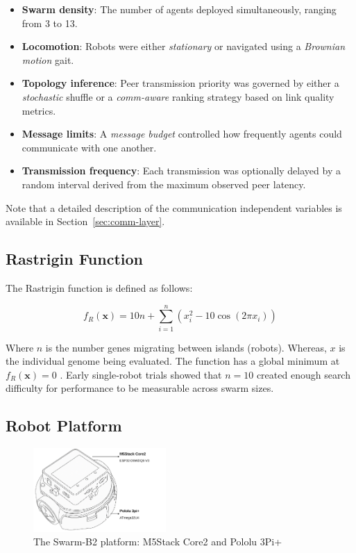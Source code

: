 \documentclass[conference]{IEEEtran}
\begin{document}
\begin{itemize}
  \item \textbf{Swarm density}: The number of agents deployed simultaneously, ranging from 3 to 13.
  \item \textbf{Locomotion}: Robots were either \emph{stationary} or navigated using a \emph{Brownian motion} gait.
  \item \textbf{Topology inference}: Peer transmission priority was governed by either a \emph{stochastic} shuffle or a \emph{comm-aware} ranking strategy based on link quality metrics.
  \item \textbf{Message limits}: A \emph{message budget} controlled how frequently agents could communicate with one another.
  \item \textbf{Transmission frequency}: Each transmission was optionally delayed by a random interval derived from the maximum observed peer latency.
\end{itemize}

Note that a detailed description of the communication independent variables is available in Section~\ref{sec:comm-layer}.

\subsection{Rastrigin Function}

The Rastrigin function is defined as follows:

\begin{equation}\label{eq:rastrigin}
f_R(\mathbf{x}) = 10n + \sum_{i=1}^{n} \left(x_i^2 - 10\cos(2\pi x_i)\right)
\end{equation}

Where $n$ is the number genes migrating between islands (robots). Whereas, $x$ is the individual genome being evaluated. The function has a global minimum at \( f_R(\mathbf{x}) = 0 \) \cite{rucinski_impact_2010}. Early single-robot trials showed that $n=10$ created enough search difficulty for performance to be measurable across swarm sizes.

\subsection{Robot Platform}\label{sec:robot_platform}
\begin{figure}[h]
    \centering
    \includegraphics[width=0.45\textwidth]{B2.pdf}
    \caption{The Swarm-B2 platform: M5Stack Core2 and Pololu 3Pi+}
    \label{fig:B2}
\end{figure}
\end{document}
